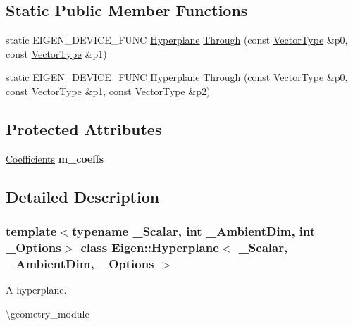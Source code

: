 \subsection*{Static Public Member Functions}
\begin{DoxyCompactItemize}
\item 
static E\+I\+G\+E\+N\+\_\+\+D\+E\+V\+I\+C\+E\+\_\+\+F\+U\+NC \mbox{\hyperlink{class_eigen_1_1_hyperplane}{Hyperplane}} \mbox{\hyperlink{class_eigen_1_1_hyperplane_ae0e7dc262623fc937b1b051595b8d3f1}{Through}} (const \mbox{\hyperlink{class_eigen_1_1_matrix}{Vector\+Type}} \&p0, const \mbox{\hyperlink{class_eigen_1_1_matrix}{Vector\+Type}} \&p1)
\item 
static E\+I\+G\+E\+N\+\_\+\+D\+E\+V\+I\+C\+E\+\_\+\+F\+U\+NC \mbox{\hyperlink{class_eigen_1_1_hyperplane}{Hyperplane}} \mbox{\hyperlink{class_eigen_1_1_hyperplane_ae105a4f5f2252069b1b1251207dca4e0}{Through}} (const \mbox{\hyperlink{class_eigen_1_1_matrix}{Vector\+Type}} \&p0, const \mbox{\hyperlink{class_eigen_1_1_matrix}{Vector\+Type}} \&p1, const \mbox{\hyperlink{class_eigen_1_1_matrix}{Vector\+Type}} \&p2)
\end{DoxyCompactItemize}
\subsection*{Protected Attributes}
\begin{DoxyCompactItemize}
\item 
\mbox{\label{class_eigen_1_1_hyperplane_a05804798a9f1d9bcda2a0a9757d16acd}} 
\mbox{\hyperlink{class_eigen_1_1_matrix}{Coefficients}} {\bfseries m\+\_\+coeffs}
\end{DoxyCompactItemize}


\subsection{Detailed Description}
\subsubsection*{template$<$typename \+\_\+\+Scalar, int \+\_\+\+Ambient\+Dim, int \+\_\+\+Options$>$\newline
class Eigen\+::\+Hyperplane$<$ \+\_\+\+Scalar, \+\_\+\+Ambient\+Dim, \+\_\+\+Options $>$}

A hyperplane. 

\textbackslash{}geometry\+\_\+module

